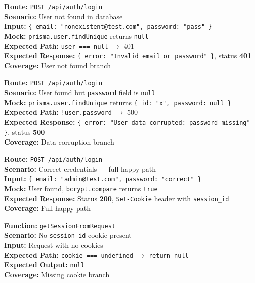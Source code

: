 \documentclass[12pt,onecolumn]{IEEEtran}
\begin{document}
\textbf{Route:} \texttt{POST /api/auth/login} \\
\textbf{Scenario:} User not found in database \\
\textbf{Input:} \texttt{\{ email: "nonexistent@test.com", password: "pass" \}} \\
\textbf{Mock:} \texttt{prisma.user.findUnique} returns \texttt{null} \\
\textbf{Expected Path:} \texttt{user === null} $\to$ 401 \\
\textbf{Expected Response:} \texttt{\{ error: "Invalid email or password" \}}, status \textbf{401} \\
\textbf{Coverage:} User not found branch



\textbf{Route:} \texttt{POST /api/auth/login} \\
\textbf{Scenario:} User found but \texttt{password} field is \texttt{null} \\
\textbf{Mock:} \texttt{prisma.user.findUnique} returns \texttt{\{ id: "x", password: null \}} \\
\textbf{Expected Path:} \texttt{!user.password} $\to$ 500 \\
\textbf{Expected Response:} \texttt{\{ error: "User data corrupted: password missing" \}}, status \textbf{500} \\
\textbf{Coverage:} Data corruption branch



\textbf{Route:} \texttt{POST /api/auth/login} \\
\textbf{Scenario:} Correct credentials --- full happy path \\
\textbf{Input:} \texttt{\{ email: "admin@test.com", password: "correct" \}} \\
\textbf{Mock:} User found, \texttt{bcrypt.compare} returns \texttt{true} \\
\textbf{Expected Response:} Status \textbf{200}, \texttt{Set-Cookie} header with \texttt{session\_id} \\
\textbf{Coverage:} Full happy path



\textbf{Function:} \texttt{getSessionFromRequest} \\
\textbf{Scenario:} No \texttt{session\_id} cookie present \\
\textbf{Input:} Request with no cookies \\
\textbf{Expected Path:} \texttt{cookie === undefined} $\to$ \texttt{return null} \\
\textbf{Expected Output:} \texttt{null} \\
\textbf{Coverage:} Missing cookie branch
\end{document}
